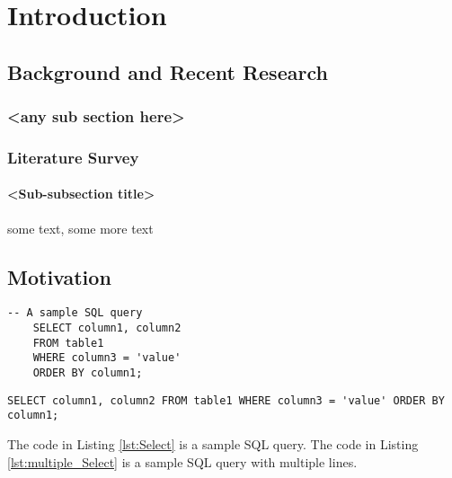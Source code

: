 \chapter{Introduction}
\hrulefill

\section{Background and Recent Research}
\subsection{<any sub section here>}

\subsection{Literature Survey}

\subsubsection{<Sub-subsection title>}
some text\cite{citation-1-name-here}, some more text


\section{Motivation}
\begin{lstlisting}[caption={Sample SQL code}, label={lst:Select}]
    -- A sample SQL query
    SELECT column1, column2
    FROM table1
    WHERE column3 = 'value'
    ORDER BY column1;
    \end{lstlisting}

\begin{lstlisting}[caption={Select query with multiple lines}, label={lst:multiple_Select}]
    SELECT column1, column2 FROM table1 WHERE column3 = 'value' ORDER BY column1;
    \end{lstlisting}

The code in Listing \ref{lst:Select} is a sample SQL query. The code in Listing \ref{lst:multiple_Select} is a sample SQL query with multiple lines.